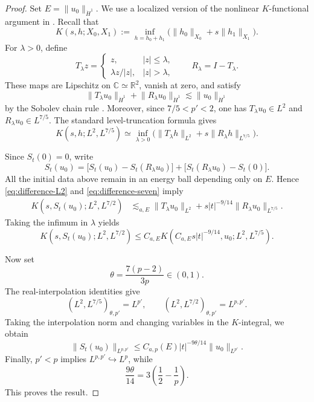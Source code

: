 \documentclass[preprint,12pt]{elsarticle}
\numberwithin{equation}{section}
\theoremstyle{definition}
\theoremstyle{remark}
\newcommand{\R}{\mathbb R}
\newcommand{\norm}[2]{\lVert #1\rVert_{#2}}
\begin{document}
\begin{proof}
	Set $E=\norm{u_0}{\dot H^1}$.  We use a localized version of the
	nonlinear $K$-functional argument in
	\cite[proof of Theorem~3, pp.~475--476]{Tartar}.  Recall that
	\[
	K(s,h;X_0,X_1)
	:=\inf_{h=h_0+h_1}
	\bigl(\norm{h_0}{X_0}+s\norm{h_1}{X_1}\bigr).
	\]
	For $\lambda>0$, define
	\[
	T_\lambda z=
	\begin{cases}
		z,& |z|\leq\lambda,\\
		\lambda z/|z|,& |z|>\lambda,
	\end{cases}
	\qquad R_\lambda=I-T_\lambda.
	\]
	These maps are Lipschitz on $\mathbb C\simeq\R^2$, vanish at zero,
	and satisfy
	\[
	\norm{T_\lambda u_0}{\dot H^1}
	+\norm{R_\lambda u_0}{\dot H^1}
	\lesssim \norm{u_0}{\dot H^1}
	\]
	by the Sobolev chain rule
	\cite[Theorem~2.1.11]{Ziemer}.  Moreover, since
	$7/5<p'<2$, one has $T_\lambda u_0\in L^2$ and
	$R_\lambda u_0\in L^{7/5}$.  The standard level-truncation formula
 \cite[Chapter~5]{BerghLofstrom} gives
	\[
	K(s,h;L^2,L^{7/5})
	\simeq
	\inf_{\lambda>0}
	\bigl(\norm{T_\lambda h}{L^2}
	+s\norm{R_\lambda h}{L^{7/5}}\bigr).
	\]
	
	Since $S_t(0)=0$, write
	\[
	S_t(u_0)
	=\bigl[S_t(u_0)-S_t(R_\lambda u_0)\bigr]
	+\bigl[S_t(R_\lambda u_0)-S_t(0)\bigr].
	\]
	All the initial data above remain in an energy ball depending only
	on $E$.  Hence \eqref{eq:difference-L2} and
	\eqref{eq:difference-seven} imply
	\[
	\begin{aligned}
		K(s,S_t(u_0);L^2,L^{7/2})
		&\lesssim_{a,E}
		\norm{T_\lambda u_0}{L^2}
		+s|t|^{-9/14}\norm{R_\lambda u_0}{L^{7/5}}.
	\end{aligned}
	\]
	Taking the infimum in $\lambda$ yields
	\[
	K(s,S_t(u_0);L^2,L^{7/2})
	\leq C_{a,E}
	K(C_{a,E}s|t|^{-9/14},u_0;L^2,L^{7/5}).
	\]
	
	Now set
	\[
	\theta=\frac{7(p-2)}{3p}\in(0,1).
	\]
	The real-interpolation identities give
	\[
	(L^2,L^{7/5})_{\theta,p'}=L^{p'},
	\qquad
	(L^2,L^{7/2})_{\theta,p'}=L^{p,p'}.
	\]
	Taking the interpolation norm and changing variables in the
	$K$-integral, we obtain
	\[
	\norm{S_t(u_0)}{L^{p,p'}}
	\leq C_{a,p}(E)|t|^{-9\theta/14}
	\norm{u_0}{L^{p'}}.
	\]
	Finally, $p'<p$ implies $L^{p,p'}\hookrightarrow L^p$, while
	\[
	\frac{9\theta}{14}
	=3\left(\frac12-\frac1p\right).
	\]
	This proves the result.
\end{proof}
\end{document}
